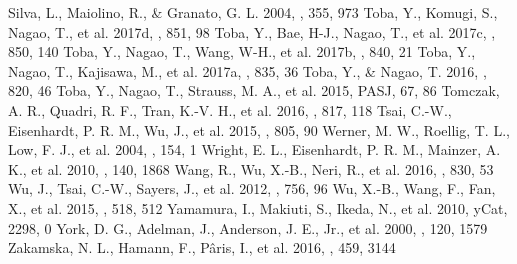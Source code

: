 \documentclass[twocolumn]{aastex6}
\begin{document}
\begin{thebibliography}{}
Silva, L., Maiolino, R., \& Granato, G. L. 2004, \mnras, 355, 973
Toba, Y., Komugi, S., Nagao, T., et al. 2017d, \apj, 851, 98
Toba, Y., Bae, H-J., Nagao, T., et al. 2017c, \apj, 850, 140
Toba, Y., Nagao, T., Wang, W-H., et al. 2017b, \apj, 840, 21
Toba, Y., Nagao, T., Kajisawa, M., et al. 2017a, \apj, 835, 36 
Toba, Y., \& Nagao, T. 2016, \apj, 820, 46
Toba, Y., Nagao, T., Strauss, M. A., et al. 2015, PASJ, 67, 86
Tomczak, A. R., Quadri, R. F., Tran, K.-V. H., et al. 2016, \apj, 817, 118
Tsai, C.-W., Eisenhardt, P. R. M., Wu, J., et al. 2015, \apj, 805, 90
Werner, M. W., Roellig, T. L., Low, F. J., et al. 2004, \apjs, 154, 1
Wright, E. L., Eisenhardt, P. R. M., Mainzer, A. K., et al. 2010, \aj, 140, 1868
Wang, R., Wu, X.-B., Neri, R., et al. 2016, \apj, 830, 53
Wu, J., Tsai, C.-W., Sayers, J., et al. 2012, \apj, 756, 96
Wu, X.-B., Wang, F., Fan, X., et al. 2015, \nat, 518, 512
Yamamura, I., Makiuti, S., Ikeda, N., et al. 2010, yCat, 2298, 0
York, D. G., Adelman, J., Anderson, J. E., Jr., et al. 2000, \aj, 120, 1579
Zakamska, N. L., Hamann, F., P\^aris, I., et al. 2016, \mnras, 459, 3144
\end{thebibliography}
\end{document}
